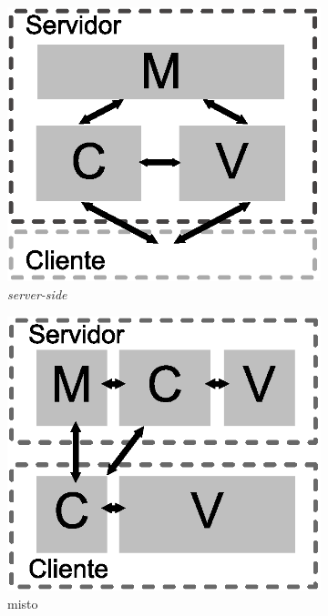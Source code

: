 \begin{figure}[h!]
	\centering
	\begin{subfigure}{.31\textwidth}
  		\centering
  		\includegraphics[width=.9\linewidth]{figuras/servidor.eps}
  		\caption{\textit{server-side}}
  		\label{fig:submvc1}
	\end{subfigure}
	\begin{subfigure}{.31\textwidth}
  		\centering
  		\includegraphics[width=.9\linewidth]{figuras/misto.eps}
  		\caption{misto}
  		\label{fig:submvc2}
	\end{subfigure}
	\begin{subfigure}{.31\textwidth}

\end{subfigure}
\end{figure}
